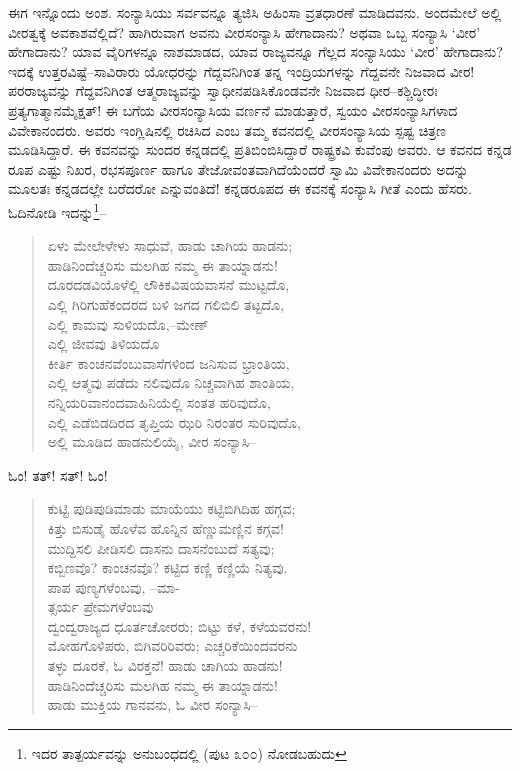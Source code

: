 ಈಗ ಇನ್ನೊಂದು ಅಂಶ. ಸಂನ್ಯಾಸಿಯು ಸರ್ವವನ್ನೂ ತ್ಯಜಿಸಿ ಅಹಿಂಸಾ ವ್ರತಧಾರಣೆ ಮಾಡಿದವನು. ಅಂದಮೇಲೆ ಅಲ್ಲಿ ವೀರತ್ವಕ್ಕೆ ಅವಕಾಶವೆಲ್ಲಿದೆ? ಹಾಗಿರುವಾಗ ಅವನು ವೀರಸಂನ್ಯಾಸಿ ಹೇಗಾದಾನು? ಅಥವಾ ಒಬ್ಬ ಸಂನ್ಯಾಸಿ ‘ವೀರ’ ಹೇಗಾದಾನು? ಯಾವ ವೈರಿಗಳನ್ನೂ ನಾಶಮಾಡದ, ಯಾವ ರಾಜ್ಯವನ್ನೂ ಗೆಲ್ಲದ ಸಂನ್ಯಾಸಿಯು ‘ವೀರ’ ಹೇಗಾದಾನು? ಇದಕ್ಕೆ ಉತ್ತರವಿಷ್ಟೆ–ಸಾವಿರಾರು ಯೋಧರನ್ನು ಗೆದ್ದವನಿಗಿಂತ ತನ್ನ ಇಂದ್ರಿಯಗಳನ್ನು ಗೆದ್ದವನೇ ನಿಜವಾದ ವೀರ! ಪರರಾಜ್ಯವನ್ನು ಗೆದ್ದವನಿಗಿಂತ ಆತ್ಮರಾಜ್ಯವನ್ನು ಸ್ವಾಧೀನಪಡಿಸಿಕೊಂಡವನೇ ನಿಜವಾದ ಧೀರ–ಕಶ್ಚಿದ್ಧೀರಃ ಪ್ರತ್ಯಗಾತ್ಮಾನಮೈಕ್ಷತ್! ಈ ಬಗೆಯ ವೀರಸಂನ್ಯಾಸಿಯ ವರ್ಣನೆ ಮಾಡುತ್ತಾರೆ, ಸ್ವಯಂ ವೀರಸಂನ್ಯಾಸಿಗಳಾದ ವಿವೇಕಾನಂದರು. ಅವರು ಇಂಗ್ಲಿಷಿನಲ್ಲಿ ರಚಿಸಿದ  ಎಂಬ ತಮ್ಮ ಕವನದಲ್ಲಿ ವೀರಸಂನ್ಯಾಸಿಯ ಸ್ಪಷ್ಟ ಚಿತ್ರಣ ಮೂಡಿಸಿದ್ದಾರೆ. ಈ ಕವನವನ್ನು ಸುಂದರ ಕನ್ನಡದಲ್ಲಿ ಪ್ರತಿಬಿಂಬಿಸಿದ್ದಾರೆ ರಾಷ್ಟ್ರಕವಿ ಕುವೆಂಪು ಅವರು. ಆ ಕವನದ ಕನ್ನಡ ರೂಪ ಎಷ್ಟು ನಿಖರ, ರಭಸಪೂರ್ಣ ಹಾಗೂ ತೇಜೋವಂತವಾಗಿದೆಯೆಂದರೆ ಸ್ವಾಮಿ ವಿವೇಕಾನಂದರು ಅದನ್ನು ಮೂಲತಃ ಕನ್ನಡದಲ್ಲೇ ಬರೆದರೋ ಎನ್ನುವಂತಿದೆ! ಕನ್ನಡರೂಪದ ಈ ಕವನಕ್ಕೆ ಸಂನ್ಯಾಸಿ ಗೀತೆ ಎಂದು ಹೆಸರು. ಓದಿನೋಡಿ ಇದನ್ನು\footnote{ಇದರ ತಾತ್ಪರ್ಯವನ್ನು ಅನುಬಂಧದಲ್ಲಿ (ಪುಟ ೩೦೦) ನೋಡಬಹುದು}–

\begin{verse}
ಏಳು ಮೇಲೇಳೇಳು ಸಾಧುವೆ, ಹಾಡು ಚಾಗಿಯ ಹಾಡನು;\\ಹಾಡಿನಿಂದೆಚ್ಚರಿಸು ಮಲಗಿಹ ನಮ್ಮ ಈ ತಾಯ್ನಾಡನು!\\ದೂರದಡವಿಯೊಳೆಲ್ಲಿ ಲೌಕಿಕವಿಷಯವಾಸನೆ ಮುಟ್ಟದೊ,\\ಎಲ್ಲಿ ಗಿರಿಗುಹೆಕಂದರದ ಬಳಿ ಜಗದ ಗಲಿಬಿಲಿ ತಟ್ಟದೊ,\\ ಎಲ್ಲಿ ಕಾಮವು ಸುಳಿಯದೊ,–ಮೇಣ್\\ಎಲ್ಲಿ ಜೀವವು ತಿಳಿಯದೊ\\ಕೀರ್ತಿ ಕಾಂಚನವೆಂಬುವಾಸೆಗಳಿಂದ ಜನಿಸುವ ಭ್ರಾಂತಿಯ,\\ಎಲ್ಲಿ ಆತ್ಮವು ಪಡೆದು ನಲಿವುದೊ ನಿಚ್ಚವಾಗಿಹ ಶಾಂತಿಯ,\\ನನ್ನಿಯರಿವಾನಂದವಾಹಿನಿಯೆಲ್ಲಿ ಸಂತತ ಹರಿವುದೊ,\\ಎಲ್ಲಿ ಎಡೆಬಿಡದಿರದ ತೃಪ್ತಿಯ ಝರಿ ನಿರಂತರ ಸುರಿವುದೊ,\\ಅಲ್ಲಿ ಮೂಡಿದ ಹಾಡನುಲಿಯೈ, ವೀರ ಸಂನ್ಯಾಸಿ–
\end{verse}

\begin{flushright}
ಓಂ! ತತ್! ಸತ್! ಓಂ!
\end{flushright}

\begin{verse}
ಕುಟ್ಟಿ ಪುಡಿಪುಡಿಮಾಡು ಮಾಯೆಯು ಕಟ್ಟಿಬಿಗಿದಿಹ ಹಗ್ಗವ;\\ಕಿತ್ತು ಬಿಸುಡೈ ಹೊಳೆವ ಹೊನ್ನಿನ ಹೆಣ್ಣುಮಣ್ಣಿನ ಕಗ್ಗವ!\\ಮುದ್ದಿಸಲಿ ಪೀಡಿಸಲಿ ದಾಸನು ದಾಸನೆಂಬುದೆ ಸತ್ಯವು;\\ಕಬ್ಬಿಣವೊ? ಕಾಂಚನವೊ? ಕಟ್ಟಿದ ಕಣ್ಣಿ ಕಣ್ಣಿಯೆ ನಿತ್ಯವು.\\ಪಾಪ ಪುಣ್ಯಗಳೆಂಬವು, –ಮಾ-\\ತ್ಸರ್ಯ ಪ್ರೇಮಗಳೆಂಬವು\\ದ್ವಂದ್ವರಾಜ್ಯದ ಧೂರ್ತಚೋರರು; ಬಿಟ್ಟು ಕಳೆ, ಕಳೆಯವರನು!\\ಮೋಹಗೊಳಿಪರು, ಬಿಗಿವರಿರಿವರು; ಎಚ್ಚರಿಕೆಯಿಂದವರನು \\ತಳ್ಳು ದೂರಕೆ, ಓ ವಿರಕ್ತನೆ! ಹಾಡು ಚಾಗಿಯ ಹಾಡನು!\\ಹಾಡಿನಿಂದೆಚ್ಚರಿಸು ಮಲಗಿಹ ನಮ್ಮ ಈ ತಾಯ್ನಾಡನು!\\ಹಾಡು ಮುಕ್ತಿಯ ಗಾನವನು, ಓ ವೀರ ಸಂನ್ಯಾಸಿ–
\end{verse}

